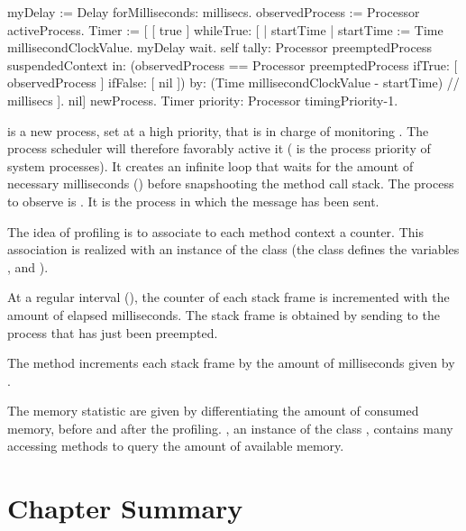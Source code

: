 \documentclass[a4paper,10pt,twoside]{book}
\begin{document}
\begin{code}
myDelay := Delay forMilliseconds: millisecs.
observedProcess := Processor activeProcess.
Timer := [
	[ true ] whileTrue: [
		| startTime |
		startTime := Time millisecondClockValue.
		myDelay wait.
		self
			tally: Processor preemptedProcess suspendedContext
			in: (observedProcess == Processor preemptedProcess 
					ifTrue: [ observedProcess ] ifFalse: [ nil ])
			by: (Time millisecondClockValue - startTime) // millisecs ].
	nil] newProcess.
Timer priority: Processor timingPriority-1.
\end{code}

 is a new process, set at a high priority, that is in charge of monitoring . The process scheduler will therefore favorably active it ( is the process priority of system processes). It creates an infinite loop that waits for the amount of necessary milliseconds () before snapshooting the method call stack. The process to observe is . It is the process in which the message  has been sent. 

The idea of profiling is to associate to each method context a counter. This association is realized with an instance of the class  (the class defines the variables ,  and ).

At a regular interval (), the counter of each stack frame is incremented with the amount of elapsed milliseconds. The stack frame is obtained by sending  to the process that has just been preempted.

The method  increments each stack frame by the amount of milliseconds given by .

The memory statistic are given by differentiating the amount of consumed memory, before and after the profiling. , an instance of the class , contains many accessing methods to query the amount of available memory.

\section{Chapter Summary}
\end{document}
